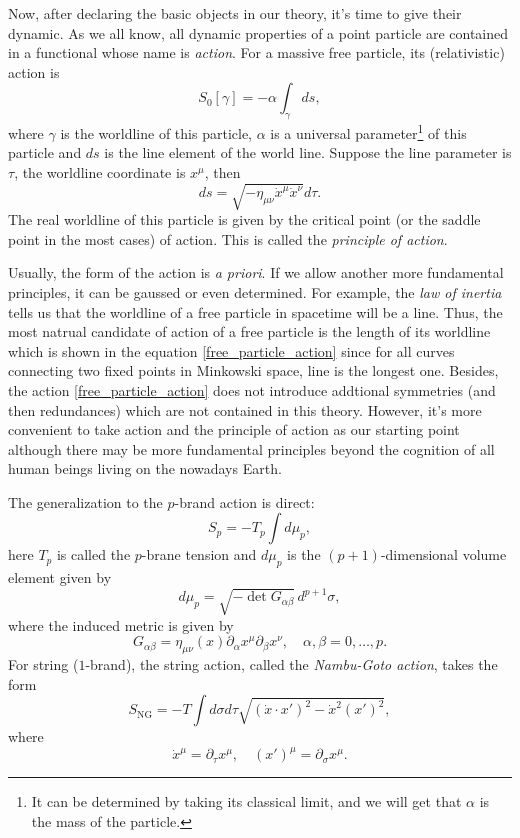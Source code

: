 Now, after declaring the basic objects in our theory, it's time to
give their dynamic. As we all know, all dynamic properties of 
a point particle are contained in a functional whose name is 
\textit{action}. For a massive free particle, its (relativistic) 
action is
\begin{equation}\label{free_particle_action}
	S_0[\gamma]=-\alpha \int_\gamma ds,
\end{equation}
where $\gamma$ is the worldline of this particle, $\alpha$ is
a universal parameter\footnote{
	It can be determined by taking its classical limit, and
	we will get that $\alpha$ is the mass of the particle.}
of this particle and $ds$
is the line element of the world line. Suppose 
the line parameter is $\tau$, the worldline coordinate
is $x^\mu$, then
\[
	ds=\sqrt{-\eta_{\mu\nu}\dot x^\mu \dot x^\nu}d\tau.
\]
The real
worldline of this particle is given by the critical point
(or the saddle point in the most cases) of action. This 
is called the \textit{principle of action}.

Usually, the form of the action is \textit{a priori}. If we
allow another more fundamental principles, it can be gaussed
or even determined. For example, the \textit{law of inertia}
tells us that the worldline of a free particle in spacetime
will be a line. Thus, the most natrual candidate of action 
of a free particle is the length of its worldline which is 
shown in the equation \eqref{free_particle_action} since
for all curves connecting two fixed points in Minkowski space,
line is the longest one. Besides, the action 
\eqref{free_particle_action} does not introduce addtional
symmetries (and then redundances) which are not contained in 
this theory. However, it's more convenient to take action 
and the principle of action as our starting point although
there may be more fundamental principles beyond the cognition
of all human beings living on the nowadays Earth.

The generalization to the $p$-brand action is direct:
\[
	S_p=-T_p\int d\mu_p,
\]
here $T_p$ is called the $p$-brane tension and $d\mu_p$ is 
the $(p+1)$-dimensional volume element given by
\[
	d\mu_p=\sqrt{-\det G_{\alpha\beta}}\,d^{p+1}\sigma,
\]
where the induced metric is given by
\[
	G_{\alpha\beta}=\eta_{\mu\nu}(x)\partial_\alpha x^\mu 
	\partial_\beta x^\nu,\quad \alpha,\beta=0,\dots,p.
\]
For string ($1$-brand), the string action, 
called the \textit{Nambu-Goto action}, takes
the form
\[
	S_{\text{NG}}=-T\int d\sigma d\tau 
	\sqrt{(\dot x\cdot x')^2-\dot x^2 (x')^2},
\]
where 
\[
	\dot x^\mu=\partial_\tau x^\mu,\quad (x')^\mu
	=\partial_\sigma x^\mu.
\]

